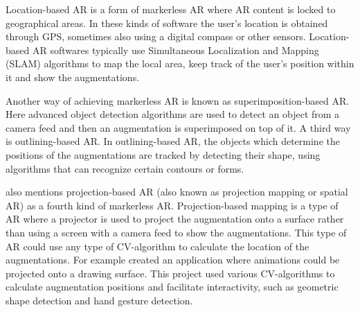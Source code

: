 	Location-based AR is a form of markerless AR where AR content is 
locked to geographical areas.\cite{locAR} In these kinds of software the user's 
location is obtained through GPS, sometimes also using a digital compass or 
other sensors.\cite{locAR} Location-based AR softwares typically use 
Simultaneous Localization and Mapping (SLAM) algorithms  to map the local area, 
keep track of the user's position within it and show the 
augmentations.\cite{estrada}\cite{slam}\par
	Another way of achieving markerless AR is known as 
superimposition-based AR. Here advanced object detection algorithms are used 
to detect an object from a camera feed and then an augmentation is 
superimposed on top of it.\cite{estrada} A third way is outlining-based AR. 
In outlining-based AR, the objects which determine the positions of the 
augmentations are tracked by detecting their shape, using algorithms that can 
recognize certain contours or forms.\cite{estrada}\par
	\textcite{estrada} also mentions projection-based AR (also known as 
projection mapping or spatial AR) as a fourth kind of markerless AR. 
Projection-based mapping is a type of AR where a projector is used to project 
the augmentation onto a surface rather than using a screen with a camera feed 
to show the augmentations.\cite{estrada} This type of AR could use any type 
of CV-algorithm to calculate the location of the augmentations. For example 
\textcite{lamp} created an application where animations could be projected 
onto a drawing surface. This project used various CV-algorithms to calculate 
augmentation positions and facilitate interactivity, such as geometric shape 
detection and hand gesture detection.\cite{lamp}
